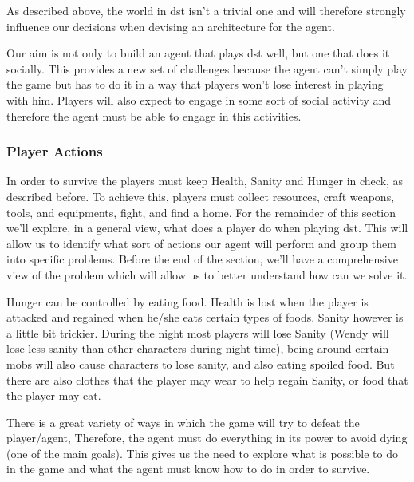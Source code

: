 As described above, the world in \gls{dst} isn't a trivial one and will therefore strongly influence our decisions when devising an architecture for the agent.

Our aim is not only to build an agent that plays \gls{dst} well, but one that does it socially.
This provides a new set of challenges because the agent can't simply play the game but has to do it in a way that players won't lose interest in playing with him.
Players will also expect to engage in some sort of social activity and therefore the agent must be able to engage in this activities.

\subsubsection{Player Actions}
In order to survive the players must keep Health, Sanity and Hunger in check, as described before.
To achieve this, players must collect resources, craft weapons, tools, and equipments, fight, and find a home.
For the remainder of this section we'll explore, in a general view, what does a player do when playing \gls{dst}.
This will allow us to identify what sort of actions our agent will perform and group them into specific problems.
Before the end of the section, we'll have a comprehensive view of the problem which will allow us to better understand how can we solve it.

Hunger can be controlled by eating food.
Health is lost when the player is attacked and regained when he/she eats certain types of foods.
Sanity however is a little bit trickier.
During the night most players will lose Sanity (Wendy will lose less sanity than other characters during night time), being around certain mobs will also cause characters to lose sanity, and also eating spoiled food.
But there are also clothes that the player may wear to help regain Sanity, or food that the player may eat.

There is a great variety of ways in which the game will try to defeat the player/agent, Therefore, the agent must do everything in its power to avoid dying (one of the main goals).
This gives us the need to explore what is possible to do in the game and what the agent must know how to do in order to survive.

